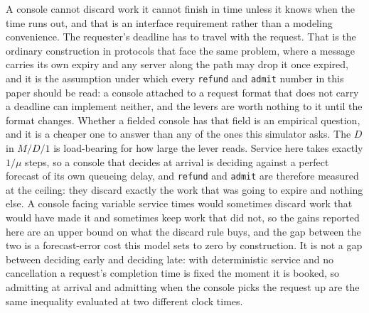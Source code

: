 \documentclass[11pt]{article}
\begin{document}
A console cannot discard work it cannot finish in time unless it knows when the time runs out, and that is an interface requirement rather than a modeling convenience. The requester's deadline has to travel with the request. That is the ordinary construction in protocols that face the same problem, where a message carries its own expiry and any server along the path may drop it once expired, and it is the assumption under which every \texttt{refund} and \texttt{admit} number in this paper should be read: a console attached to a request format that does not carry a deadline can implement neither, and the levers are worth nothing to it until the format changes. Whether a fielded console has that field is an empirical question, and it is a cheaper one to answer than any of the ones this simulator asks. The $D$ in $M/D/1$ is load-bearing for how large the lever reads. Service here takes exactly $1/\mu$ steps, so a console that decides at arrival is deciding against a perfect forecast of its own queueing delay, and \texttt{refund} and \texttt{admit} are therefore measured at the ceiling: they discard exactly the work that was going to expire and nothing else. A console facing variable service times would sometimes discard work that would have made it and sometimes keep work that did not, so the gains reported here are an upper bound on what the discard rule buys, and the gap between the two is a forecast-error cost this model sets to zero by construction. It is not a gap between deciding early and deciding late: with deterministic service and no cancellation a request's completion time is fixed the moment it is booked, so admitting at arrival and admitting when the console picks the request up are the same inequality evaluated at two different clock times.
\end{document}
